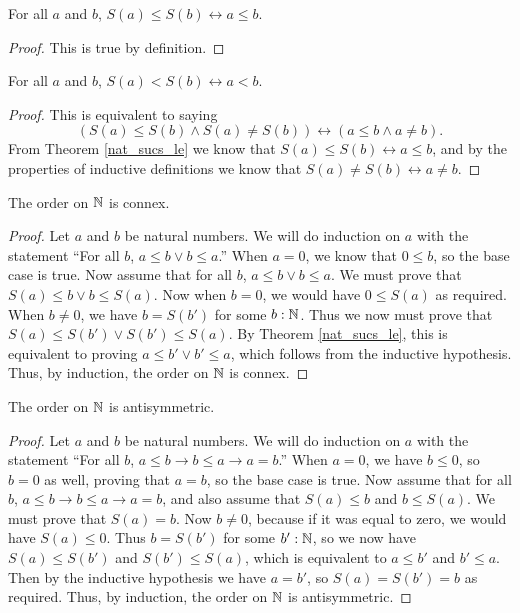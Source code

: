 \documentclass[../math.tex]{subfiles}
\begin{document}
\begin{theorem} \label{nat_sucs_le}
    For all $a$ and $b$, $S(a) \leq S(b) \leftrightarrow a \leq b$.
\end{theorem}
\begin{proof}
    This is true by definition.
\end{proof}

\begin{theorem} \label{nat_sucs_lt}
    For all $a$ and $b$, $S(a) < S(b) \leftrightarrow a < b$.
\end{theorem}
\begin{proof}
    This is equivalent to saying
    \[
        (S(a) \leq S(b) \wedge S(a) \neq S(b)) \leftrightarrow
        (a \leq b \wedge a \neq b).
    \]
    From Theorem \ref{nat_sucs_le} we know that $S(a) \leq S(b) \leftrightarrow
    a \leq b$, and by the properties of inductive definitions we know that $S(a)
    \neq S(b) \leftrightarrow a \neq b$.
\end{proof}

\begin{instance}
    The order on $\mathbb{N}$ is connex.
\end{instance}
\begin{proof}
    Let $a$ and $b$ be natural numbers.  We will do induction on $a$ with the
    statement ``For all $b$, $a \leq b \vee b \leq a$.''  When $a = 0$, we know
    that $0 \leq b$, so the base case is true.  Now assume that for all $b$, $a
    \leq b \vee b \leq a$.  We must prove that $S(a) \leq b \vee b \leq S(a)$.
    Now when $b = 0$, we would have $0 \leq S(a)$ as required.  When $b \neq 0$,
    we have $b = S(b')$ for some $b : \mathbb{N}$.  Thus we now must prove that $S(a)
    \leq S(b') \vee S(b') \leq S(a)$.  By Theorem \ref{nat_sucs_le}, this is
    equivalent to proving $a \leq b' \vee b' \leq a$, which follows from the
    inductive hypothesis.  Thus, by induction, the order on $\mathbb{N}$ is connex.
\end{proof}

\begin{instance}
    The order on $\mathbb{N}$ is antisymmetric.
\end{instance}
\begin{proof}
    Let $a$ and $b$ be natural numbers.  We will do induction on $a$ with the
    statement ``For all $b$, $a \leq b \rightarrow b \leq a \rightarrow a =
    b$.''  When $a = 0$, we have $b \leq 0$, so $b = 0$ as well, proving that $a
    = b$, so the base case is true.  Now assume that for all $b$, $a \leq b
    \rightarrow b \leq a \rightarrow a = b$, and also assume that $S(a) \leq b$
    and $b \leq S(a)$.  We must prove that $S(a) = b$.  Now $b \neq 0$, because
    if it was equal to zero, we would have $S(a) \leq 0$.  Thus $b = S(b')$ for
    some $b' : \mathbb{N}$, so we now have $S(a) \leq S(b')$ and $S(b') \leq S(a)$,
    which is equivalent to $a \leq b'$ and $b' \leq a$.  Then by the inductive
    hypothesis we have $a = b'$, so $S(a) = S(b') = b$ as required.  Thus, by
    induction, the order on $\mathbb{N}$ is antisymmetric.
\end{proof}
\end{document}
